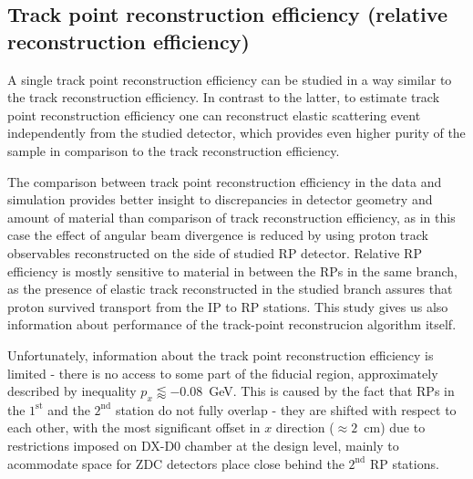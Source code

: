\subsection{Track point reconstruction efficiency (relative reconstruction efficiency)}\label{subsec:rpTrackPointRecoEffSyst}

A single track point reconstruction efficiency can be studied in a way similar to the track reconstruction efficiency. In contrast to the latter, to estimate track point reconstruction efficiency one can reconstruct elastic scattering event independently from the studied detector, which provides even higher purity of the sample in comparison to the track reconstruction efficiency.

The comparison between track point reconstruction efficiency in the data and simulation provides better insight to discrepancies in detector geometry and amount of material than comparison of track reconstruction efficiency, as in this case the effect of angular beam divergence is reduced by using proton track observables reconstructed on the side of studied RP detector. Relative RP efficiency is mostly sensitive to material in between the RPs in the same branch, as the presence of elastic track reconstructed in the studied branch assures that proton survived transport from the IP to RP stations. This study gives us also information about performance of the track-point reconstrucion algorithm itself.

Unfortunately, information about the track point reconstruction efficiency is limited - there is no access to some part of the fiducial region, approximately described by inequality $p_{x}\lessapprox-0.08$~GeV. This is caused by the fact that RPs in the $1^{\text{st}}$ and the $2^{\text{nd}}$ station do not fully overlap - they are shifted with respect to each other, with the most significant offset in $x$ direction ($\approx2$~cm) due to restrictions imposed on DX-D0 chamber at the design level, mainly to acommodate space for ZDC detectors place close behind the $2^{\text{nd}}$ RP stations.

